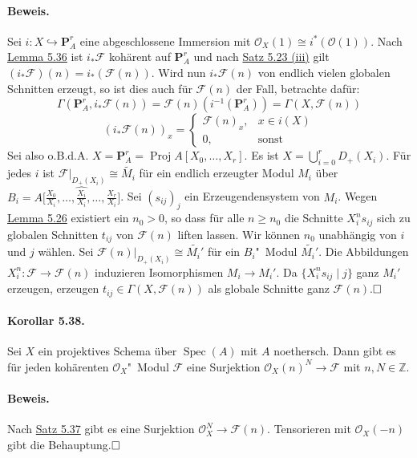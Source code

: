 \documentclass[11pt,b5paper,openany]{memoir}
\def \qed {$\hfill\square$}
\begin{document}
\paragraph{Beweis.} Sei $i:X\hookrightarrow \mathbf{P}_A^r$ eine abgeschlossene Immersion mit $\mathcal{O}_X(1)\cong i^\ast(\mathcal{O}(1))$. Nach \hyperref[5.36]{Lemma 5.36} ist $i_\ast\mathcal{F}$ kohärent auf $\mathbf{P}_A^r$ und nach \hyperref[5.23]{Satz 5.23 (iii)} gilt $(i_\ast\mathcal{F})(n)=i_\ast(\mathcal{F}(n))$. Wird nun $i_\ast\mathcal{F}(n)$ von endlich vielen globalen Schnitten erzeugt, so ist dies auch für $\mathcal{F}(n)$ der Fall, betrachte dafür:
\[\Gamma(\mathbf{P}_A^r, i_\ast\mathcal{F}(n)) = \mathcal{F}(n)(i^{-1}(\mathbf{P}_A^r))=\Gamma(X,\mathcal{F}(n)) \]
\[(i_\ast\mathcal{F}(n))_x = \begin{cases}
\mathcal{F}(n)_x, & x\in i(X)\\
0, &\text{sonst}
\end{cases} \]
Sei also o.B.d.A. $X=\mathbf{P}_A^r=\operatorname{Proj}A[X_0,\ldots,X_r]$. Es ist $X=\bigcup_{i=0}^r D_+(X_i)$. Für jedes $i$ ist $\mathcal{F}|_{D_+(X_i)}\cong\widetilde{M_i}$ für ein endlich erzeugter Modul $M_i$ über $B_i=A\big[\frac{X_0}{X_i},\ldots,\widehat{\frac{X_i}{X_i}},\ldots,\frac{X_r}{X_i}\big]$. Sei $(s_{ij})_j$ ein Erzeugendensystem von $M_i$. Wegen \hyperref[5.26]{Lemma 5.26} existiert ein $n_0>0$, so dass für alle $n\geq n_0$ die Schnitte $X_i^ns_{ij}$ sich zu globalen Schnitten $t_{ij}$ von $\mathcal{F}(n)$ liften lassen. Wir können $n_0$ unabhängig von $i$ und $j$ wählen. Sei $\mathcal{F}(n)|_{D_+(X_i)}\cong\widetilde{M_i'}$ für ein $B_i$"~Modul $\widetilde{M_i'}$. Die Abbildungen $X_i^n:\mathcal{F}\to\mathcal{F}(n)$ induzieren Isomorphismen $M_i\to M_i'$. Da $\{X_i^ns_{ij}\mid j\}$ ganz $M_i'$ erzeugen, erzeugen $t_{ij}\in\Gamma(X,\mathcal{F}(n))$ als globale Schnitte ganz $\mathcal{F}(n)$.\qed

\paragraph{Korollar 5.38.}\label{5.38} Sei $X$ ein projektives Schema über $\operatorname{Spec}(A)$ mit $A$ noethersch. Dann gibt es für jeden kohärenten $\mathcal{O}_X$"~Modul $\mathcal{F}$ eine Surjektion $\mathcal{O}_X(n)^N\to\mathcal{F}$ mit $n,N\in\mathbb{Z}$.

\paragraph{Beweis.} Nach \hyperref[5.37]{Satz 5.37} gibt es eine Surjektion $\mathcal{O}_X^N\to\mathcal{F}(n)$. Tensorieren mit $\mathcal{O}_X(-n)$ gibt die Behauptung.\qed
\end{document}
